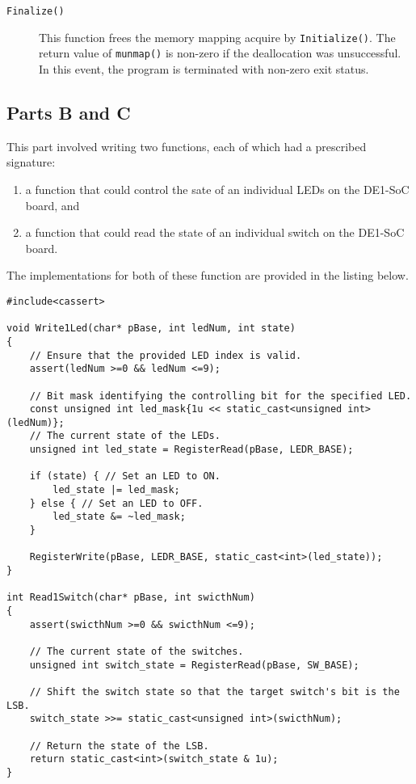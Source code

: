 \documentclass[11pt, letterpaper]{article} %
\begin{document}
\begin{description}
    \item[\texttt{Finalize()}] This function frees the memory mapping acquire by \texttt{Initialize()}. The return value of \texttt{munmap()} is non-zero if the deallocation was unsuccessful. In this event, the program is terminated with non-zero exit status.
\end{description}

\subsection*{Parts B and C}
This part involved writing two functions, each of which had a prescribed signature:
\begin{enumerate}
    \item a function that could control the sate of an individual LEDs on the DE1-SoC board, and
    \item a function that could read the state of an individual switch on the DE1-SoC board.
\end{enumerate}
The implementations for both of these function are provided in the listing below.

\begin{lstlisting}[style=labreportstyle-c++]
#include<cassert>   

void Write1Led(char* pBase, int ledNum, int state)
{
    // Ensure that the provided LED index is valid.
    assert(ledNum >=0 && ledNum <=9);
    
    // Bit mask identifying the controlling bit for the specified LED.
    const unsigned int led_mask{1u << static_cast<unsigned int>(ledNum)};
    // The current state of the LEDs.
    unsigned int led_state = RegisterRead(pBase, LEDR_BASE);
    
    if (state) { // Set an LED to ON.
        led_state |= led_mask;
    } else { // Set an LED to OFF.
        led_state &= ~led_mask;
    }

    RegisterWrite(pBase, LEDR_BASE, static_cast<int>(led_state));
}

int Read1Switch(char* pBase, int swicthNum)
{
    assert(swicthNum >=0 && swicthNum <=9);
    
    // The current state of the switches.
    unsigned int switch_state = RegisterRead(pBase, SW_BASE);
    
    // Shift the switch state so that the target switch's bit is the LSB.
    switch_state >>= static_cast<unsigned int>(swicthNum);
    
    // Return the state of the LSB.
    return static_cast<int>(switch_state & 1u);
}
\end{lstlisting}
\end{document}
